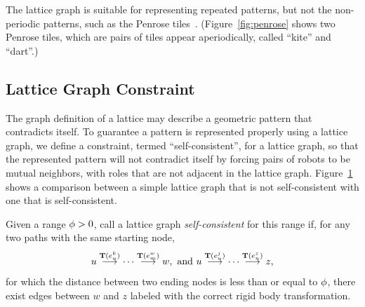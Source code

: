 The lattice graph is suitable for representing repeated patterns, but not the non-periodic patterns, 
such as the Penrose tiles~\cite{Pen79, Gum96}. 
(Figure~\ref{fig:penrose} shows two Penrose tiles, which are pairs of tiles appear aperiodically, called ``kite'' and ``dart''.)


\subsection{Lattice Graph Constraint}
The graph definition of a lattice may describe a geometric pattern that contradicts itself. 
To guarantee a pattern is represented properly using a lattice graph, we define a constraint, termed ``self-consistent'', for a lattice graph, so that the represented pattern will not contradict itself by forcing pairs of robots to be mutual neighbors, with roles that are not adjacent in the lattice graph. 
%
Figure~\ref{fig:self-consistent-graph} shows a comparison between a simple
lattice graph that is not self-consistent with one that is self-consistent.


\begin{defn}
  \label{def:selfconsistent}
  Given a range $\phi > 0$, call a lattice graph \textit{self-consistent} for
  this range if, for any two paths with the same starting node,
  $$ {u}\overset{\mathbf{T}(e_u^{k})}{\longrightarrow}{\cdots}\overset{\mathbf{T}(e_m^{w})}{\longrightarrow}{w}, \mbox{ and } 
    {u}\overset{\mathbf{T}(e_u^{j})}{\longrightarrow}{\cdots}\overset{\mathbf{T}(e_n^{z})}{\longrightarrow}{z}, $$
  for which the distance between two ending nodes is less than or equal to
  $\phi$, there exist edges between $w$ and $z$ labeled with the correct rigid body transformation.
\end{defn}


\begin{figure}
    \centering
    
    \label{fig:self-consistent-graph}
\end{figure}

